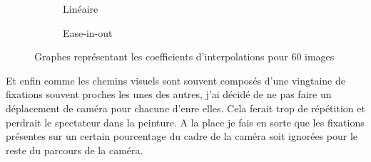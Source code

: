 \begin{figure}[ht]
    \centering
    \begin{subfigure}{.49\textwidth}
        \centering
        \caption{Linéaire}
        \label{subfig:lineaire}
    \end{subfigure}
    \begin{subfigure}{.49\textwidth}
        \centering
        \caption{Ease-in-out}
        \label{subfig:ease}
    \end{subfigure}
    \caption{Graphes représentant les coefficients d'interpolations pour 60 images}
    \label{fig:graphes}
\end{figure}

\par
Et enfin comme les chemins visuels sont souvent composés d'une vingtaine de fixations souvent proches les unes des autres, j'ai décidé de ne pas faire un déplacement de caméra pour chacune d'enre elles. Cela ferait trop de répétition et perdrait le spectateur dans la peinture. A la place je fais en sorte que les fixations présentes sur un certain pourcentage du cadre de la caméra soit ignorées pour le reste du parcours de la caméra.


